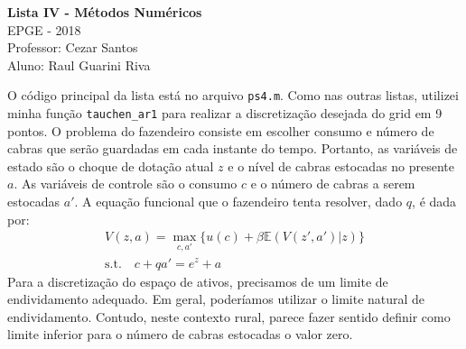 \documentclass[11pt]{article}
\theoremstyle{definition}
\newcommand{\E}{\mathbb{E}}
\theoremstyle{solution}
\begin{document}
	\begin{center}
		{\Large{\textbf{Lista IV - Métodos Numéricos}}}\\
		\vspace{0.2cm}
		EPGE - 2018\\
		Professor: Cezar Santos\\
		Aluno: Raul Guarini Riva
	\end{center}
	

O código principal da lista está no arquivo \texttt{ps4.m}. Como nas outras listas, utilizei minha função \texttt{tauchen\_ar1} para realizar a discretização desejada do grid em 9 pontos. O problema do fazendeiro consiste em escolher consumo e número de cabras que serão guardadas em cada instante do tempo. Portanto, as variáveis de estado são o choque de dotação atual $z$ e o nível de cabras estocadas no presente $a$. As variáveis de controle são o consumo $c$ e o número de cabras a serem estocadas $a'$. A equação funcional que o fazendeiro tenta resolver, dado $q$, é dada por:
\begin{gather*}
	V(z, a) = \max\limits_{c, a'} \{ u(c) + \beta\E(V(z', a')|z)\}\\
	\text{s.t.} \quad c + qa' = e^z + a
\end{gather*}
Para a discretização do espaço de ativos, precisamos de um limite de endividamento adequado. Em geral, poderíamos utilizar o limite natural de endividamento. Contudo, neste contexto rural, parece fazer sentido definir como limite inferior para o número de cabras estocadas o valor zero.
\end{document}
